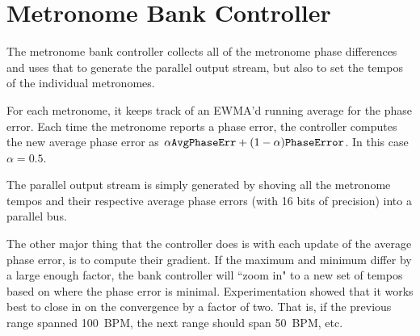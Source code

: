 \documentclass[letterpaper]{article}
\begin{document}
\section{Metronome Bank Controller}

    The metronome bank controller collects all of the metronome phase
    differences and uses that to generate the parallel output stream, but also
    to set the tempos of the individual metronomes.

    For each metronome, it keeps track of an EWMA'd running average for the
    phase error.  Each time the metronome reports a phase error, the controller
    computes the new average phase error as $\alpha \textrm{\texttt{AvgPhaseErr}}
    + (1-\alpha) \textrm{\texttt{PhaseError}}$.  In this case $\alpha=0.5$.

    The parallel output stream is simply generated by shoving all the metronome
    tempos and their respective average phase errors (with 16 bits of precision)
    into a parallel bus.

    The other major thing that the controller does is with each update of the
    average phase error, is to compute their gradient.  If the maximum and
    minimum differ by a large enough factor, the bank controller will ``zoom
    in" to a new set of tempos based on where the phase error is minimal.
    Experimentation showed that it works best to close in on the convergence by
    a factor of two.  That is, if the previous range spanned 100~BPM, the next
    range should span 50~BPM, etc.
\end{document}
